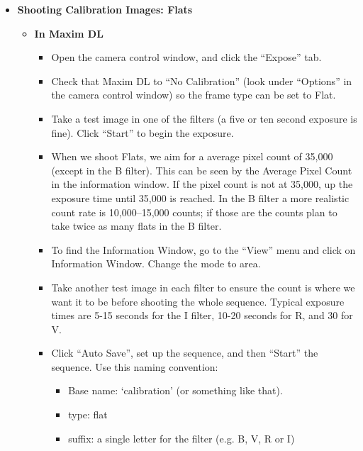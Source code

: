 \documentclass[letterpaper, 12pt]{report}
\begin{document}
	\begin{itemize}
		\item {\large \textbf{Shooting Calibration Images: Flats}}
		\begin{itemize}
			\item {\large \textbf{In Maxim DL}}
			\begin{itemize}
				\item Open the camera control window, and click the ``Expose'' tab.
				\item Check that Maxim DL to ``No Calibration'' (look under ``Options'' in the camera control window) so the frame type can be set to Flat.
				\item Take a test image in one of the filters (a five or ten second exposure is fine). Click ``Start'' to begin the exposure.
				\item When we shoot Flats, we aim for a average pixel count of 35,000 (except in the B filter). This can be seen by the Average Pixel Count in the information window. If the pixel count is not at 35,000, up the exposure time until 35,000 is reached. In the B filter a more realistic count rate is 10,000--15,000 counts; if those are the counts plan to take twice as many flats in the B filter.
				\item To find the Information Window, go to the ``View'' menu and click on Information Window. Change the mode to area.
				\item Take another test image in each filter to ensure the count is where we want it to be before shooting the whole sequence. Typical exposure times are 5-15 seconds for the I filter, 10-20 seconds for R, and 30 for V.
				\item Click ``Auto Save'', set up the sequence, and then ``Start'' the sequence. Use this naming convention:
				\begin{itemize}
					\item Base name: `calibration' (or something like that).
					\item type: flat
					\item suffix: a single letter for the filter (e.g. B, V, R or I)
				\end{itemize}
			\end{itemize}
		\end{itemize}
	\end{itemize}
\end{document}
